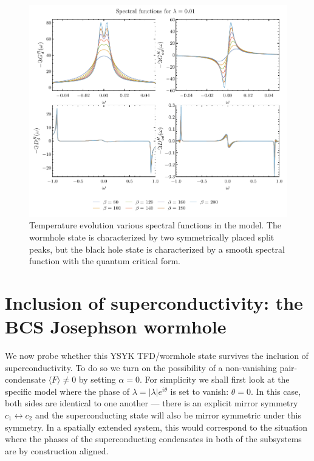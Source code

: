 \begin{figure}[t!]
    \centering
    \includegraphics[width=\linewidth]{figures/chapter3/v3TempEvolnSpectralGapMetalWH.pdf}
    \caption{Temperature evolution various spectral functions in the model. The wormhole state is characterized by two symmetrically placed split peaks, but the black hole state is characterized by a smooth spectral function with the quantum critical form. 
    }
    \label{fig:GreenFunctionPlotsMetalv2}
\end{figure}



\section{Inclusion of superconductivity: the BCS Josephson wormhole}
\label{sec:sc-state}

We now probe whether this YSYK TFD/wormhole state survives the inclusion of superconductivity. To do so we turn on the possibility of a non-vanishing pair-condensate $\langle F\rangle\neq 0$ by setting $\alpha=0$.
For simplicity we shall first look at the specific model where the phase of $\lambda=|\lambda|e^{i\theta}$ is set to vanish: $\theta=0$. In this case, both sides are identical to one another --- there is an explicit mirror symmetry $c_1 \leftrightarrow c_2$ and the superconducting state will also be mirror symmetric under this symmetry.
In a spatially extended system, this would correspond to the situation where the phases of the superconducting condensates in both of the subsystems are by construction aligned.
 
